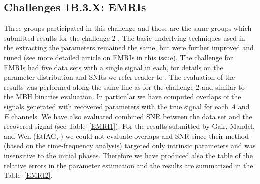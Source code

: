 \documentclass{iopart}
\begin{document}
\subsection{Challenges 1B.3.X: EMRIs}

Three groups participated in this challenge and those are the same groups which 
submitted results for the challenge 2 \cite{mldcgwdaw2}. The basic underlying techniques 
used in the extracting the parameters remained the same, but were further 
improved and tuned (see more detailed article on EMRIs in this issue).
The challenge for EMRIs had five data sets with a single signal in each, for details on the 
parameter distribution and SNRs we refer reader to \cite{mldcgwdaw2}. The evaluation of the 
results was performed along the same line as for the challenge 2 and similar to the MBH binaries 
evaluation. In particular we have computed overlaps of the signals generated with recovered 
parameters with the true signal for each $A$ and $E$ channels. We have also evaluated 
combined SNR between the data set and the recovered signal (see Table~\ref{EMRI1}).
 For the results submitted by Gair, Mandel, and Wen (EtfAG, \cite{gmw}) we could not evaluate overlaps and 
 SNR since their method (based on the time-frequency analysis) targeted only intrinsic parameters and was insensitive to the initial phases. Therefore we have produced also the table of the relative errors in the parameter estimation and the results are summarized in the 
 Table~\ref{EMRI2}.
 
\end{document}
